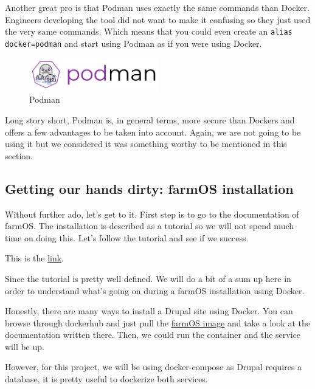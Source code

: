Another great pro is that Podman uses exactly the same commands than Docker. Engineers developing the tool did not want to make it confusing so they just used the very same commands. Which means that you could even create an \verb|alias docker=podman| and start using Podman as if you were using Docker.

\begin{figure}[H]
    \centering
    \includegraphics[width=0.5\textwidth]{fig/podman_logo.png}
        \caption{Podman}
    \label{fig:podman-logo}
\end{figure}


Long story short, Podman is, in general terms, more secure than Dockers and offers a few advantages to be taken into account. Again, we are not going to be using it but we considered it was something worthy to be mentioned in this section.

\vspace{7mm}
\subsection{Getting our hands dirty: farmOS installation}
Without further ado, let's get to it. First step is to go to the documentation of farmOS. The installation is described as a tutorial so we will not spend much time on doing this. Let's follow the tutorial and see if we success. 

This is the \href{https://farmos.org/hosting/docker/}{link}.

Since the tutorial is pretty well defined. We will do a bit of a sum up here in order to understand what's going on during a farmOS installation using Docker.

Honestly, there are many ways to install a Drupal site using Docker. You can browse through dockerhub\cite{dockerhub} and just pull the \href{https://hub.docker.com/r/farmos/farmos}{farmOS image} and take a look at the documentation written there. Then, we could run the container and the service will be up.

However, for this project, we will be using docker-compose as Drupal requires a database, it is pretty useful to dockerize both services.

